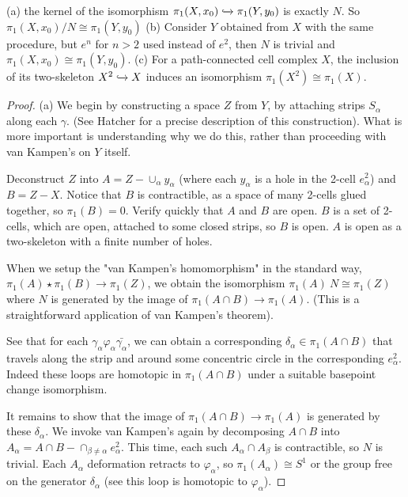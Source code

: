 \documentclass[10pt]{article}
\begin{document}
\begin{theorem}
	(a) the kernel of the isomorphism $\pi_1(X, x_0) \xhookrightarrow{} \pi_1(Y,
	y_0)$ is exactly $N$. So $\pi_1(X, x_0) / N \cong \pi_1(Y, y_0)$ 
	(b) Consider $Y$ obtained from $X$ with the same procedure, but $e^n$ for $n
	> 2$ used instead of $e^2$, then $N$ is trivial and $\pi_1(X, x_0) \cong
	\pi_1(Y, y_0)$.
	(c) For a path-connected cell complex $X$, the inclusion of its two-skeleton
	$X^2 \xhookrightarrow{} X$ induces an isomorphism $\pi_1(X^2) \cong
	\pi_1(X)$.
\end{theorem}

\begin{proof}

(a) We begin by constructing a space $Z$ from $Y$, by attaching strips $S_{\alpha}$
along each $\gamma$. (See Hatcher for a precise description of this
construction). What is more important is understanding why we do this, rather
than proceeding with van Kampen's on $Y$ itself.

Deconstruct $Z$ into $A = Z - \cup_{\alpha} y_{\alpha}$ (where each
$y_{\alpha}$ is a hole in the 2-cell $e^2_{\alpha}$) and $B = Z - X$. Notice
that $B$ is contractible, as a space of many 2-cells glued together, so
$\pi_1(B) = 0$. Verify quickly that $A$ and $B$ are open. $B$ is a set of
2-cells, which are open, attached to some closed strips, so $B$ is open. $A$ is
open as a two-skeleton with a finite number of holes.

When we setup the "van Kampen's homomorphism" in the standard
way, $\pi_1(A) \star \pi_1(B) \to \pi_1(Z)$, we obtain the isomorphism
$\pi_1(A) \ N \cong \pi_1(Z)$ where $N$ is generated by the image of $\pi_1(A \cap B) \to \pi_1(A)$. (This is a straightforward application of van Kampen's theorem).

See that for each $\gamma_{\alpha} \varphi_{\alpha} \bar{\gamma_{\alpha}}$, we
can obtain a corresponding $\delta_{\alpha} \in \pi_1(A \cap B)$ that travels along the
strip and around some concentric circle in the corresponding $e^2_{\alpha}$.
Indeed these loops are homotopic in $\pi_1(A \cap B)$ under a suitable
basepoint change isomorphism.

It remains to show that the image of $\pi_1(A \cap B) \to \pi_1(A)$ is
generated by these $\delta_{\alpha}$. We invoke van Kampen's again by
decomposing $A \cap B$ into $A_{\alpha} = A \cap B - \cap_{\beta \neq \alpha}
e^2_{\alpha}$. This time, each such $A_{\alpha} \cap A_{\beta}$ is
contractible, so $N$ is trivial. Each $A_{\alpha}$ deformation retracts to
$\varphi_{\alpha}$, so  $\pi_1(A_{\alpha}) \cong S^1$ or the group free on the
generator $\delta_{\alpha}$ (see this loop is homotopic to $\varphi_{\alpha}$).


\end{proof}
\end{document}
